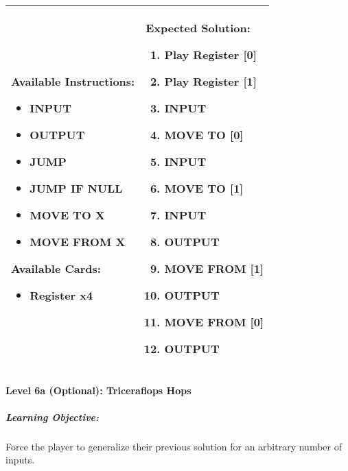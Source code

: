 \begin{center}
    \begin{tabular}{ | m{5cm} | m{9cm} | } 
        \hline
            \textbf{Available Instructions:} 
            \begin{itemize}
                \setlength\itemsep{-.35em}
                \item INPUT
                \item OUTPUT
                \item JUMP
                \item JUMP IF NULL
                \item MOVE TO X
                \item MOVE FROM X
            \end{itemize}
            \textbf{Available Cards:} 
            \begin{itemize}
                \setlength\itemsep{-.35em}
                \item Register x4
            \end{itemize}& 
            \textbf{Expected Solution:} 
            \begin{enumerate}
                \setlength\itemsep{-.35em}
                \item Play Register [0]
                \item Play Register [1]
                \item INPUT
                \item MOVE TO [0]
                \item INPUT
                \item MOVE TO [1]
                \item INPUT
                \item OUTPUT
                \item MOVE FROM [1] 
                \item OUTPUT
                \item MOVE FROM [0] 
                \item OUTPUT
            \end{enumerate}
            \\
        \hline
    \end{tabular}
\end{center}


\paragraph{Level 6a (Optional): Triceraflops Hops}
\subparagraph{Learning Objective:} Force the player to generalize their previous solution for an arbitrary number of inputs.

